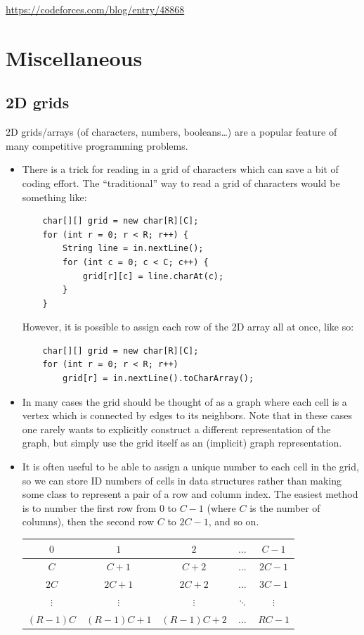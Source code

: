 \documentclass[10pt]{book}
\begin{document}
\url{https://codeforces.com/blog/entry/48868}

\chapter{Miscellaneous}

\section{2D grids}

2D grids/arrays (of characters, numbers, booleans\dots) are a popular
feature of many competitive programming problems.

\begin{itemize}
\item There is a trick for reading in a grid of characters which can
  save a bit of coding effort.  The ``traditional'' way to read a grid of
  characters would be something like:
  \begin{verbatim}
    char[][] grid = new char[R][C];
    for (int r = 0; r < R; r++) {
        String line = in.nextLine();
        for (int c = 0; c < C; c++) {
            grid[r][c] = line.charAt(c);
        }
    }
  \end{verbatim}
  However, it is possible to assign each row of the 2D array all at
  once, like so:
  \begin{verbatim}
    char[][] grid = new char[R][C];
    for (int r = 0; r < R; r++)
        grid[r] = in.nextLine().toCharArray();
  \end{verbatim}
\item In many cases the grid should be thought of as a graph where
  each cell is a vertex which is connected by edges to its neighbors.
  Note that in these cases one rarely wants to explicitly construct
  a different representation of the graph, but simply use the grid
  itself as an (implicit) graph representation.
\item It is often useful to be able to assign a unique number to each
  cell in the grid, so we can store ID numbers of cells in data
  structures rather than making some class to represent a pair of a
  row and column index.  The easiest method is to number the first row
  from $0$ to $C-1$ (where $C$ is the number of columns), then the
  second row $C$ to $2C-1$, and so on.

  \begin{tabular}{|c|c|c|c|c|}
    \hline
    $0$ & $1$ & $2$ & $\dots$ & $C-1$ \\
    \hline
    $C$ & $C+1$ & $C+2$ & $\dots$ & $2C-1$ \\
    \hline
    $2C$ & $2C+1$ & $2C+2$ & $\dots$ & $3C-1$ \\
    \hline
    $\vdots$ & $\vdots$ & $\vdots$ & $\ddots$ & $\vdots$ \\
    \hline
    $(R-1)C$ & $(R-1)C+1$ & $(R-1)C+2$ & $\dots$ & $RC-1$ \\
    \hline
  \end{tabular}


\end{itemize}
\end{document}
